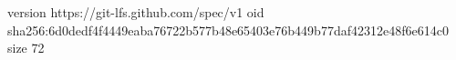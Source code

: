 version https://git-lfs.github.com/spec/v1
oid sha256:6d0dedf4f4449eaba76722b577b48e65403e76b449b77daf42312e48f6e614c0
size 72
